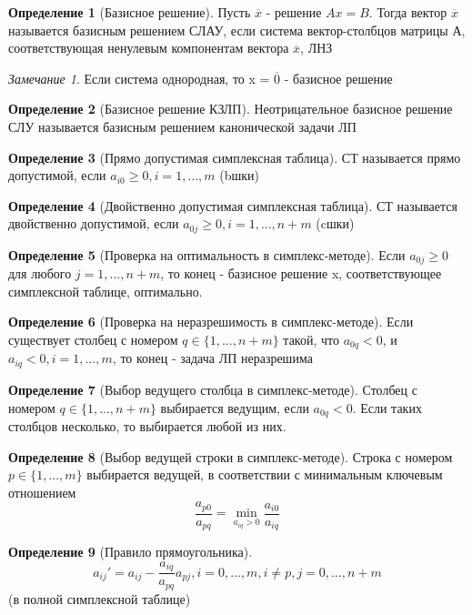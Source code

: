 \documentclass[a4paper]{article}
\theoremstyle{definition}
\newtheorem*{definition}{Определение}
\theoremstyle{remark}
\newtheorem*{remark}{Замечание}
\begin{document}
\begin{definition}[Базисное решение]
	Пусть $\overline{x}$ - решение $Ax = B$. Тогда вектор $\overline{x}$ называется базисным решением СЛАУ, если система вектор-столбцов матрицы А, соответствующая ненулевым компонентам вектора $\overline{x}$, ЛНЗ
\end{definition}\begin{remark}
	Если система однородная, то x = $\overline{0}$ - базисное решение
\end{remark}
\begin{definition}[Базисное решение КЗЛП]
	Неотрицательное базисное решение СЛУ называется базисным решением канонической задачи ЛП
\end{definition}

\begin{definition}[Прямо допустимая симплексная таблица]
	СТ называется прямо допустимой, если $a_{i0}\geq 0, i = 1, \dots, m$ (bшки)
\end{definition}
\begin{definition}[Двойственно допустимая симплексная таблица]
	СТ называется двойственно допустимой, если $a_{0j}\geq 0, i = 1, \dots, n+m$ (cшки)
\end{definition}
\begin{definition}[Проверка на оптимальность в симплекс-методе]
	Если $a_{0j} \ge 0$ для любого $j=1,…,n+m$, то конец - базисное решение x, соответствующее
	симплексной таблице, оптимально.
\end{definition}
\begin{definition}[Проверка на неразрешимость в симплекс-методе]
	Если существует столбец с номером $q\in \{1,...,n+m\}$ такой, что $a_{0q}<0$, и $a_{iq}<0, i=1,…,m$, то
	конец - задача ЛП неразрешима
\end{definition}
\begin{definition}[Выбор ведущего столбца в симплекс-методе]
	Столбец с номером $q\in\{1,...,n+m\}$ выбирается ведущим, если $a_{0q}<0$. Если таких столбцов
	несколько, то выбирается любой из них.
\end{definition}
\begin{definition}[Выбор ведущей строки в симплекс-методе]
	Строка с номером $p\in\{1,...,m\}$ выбирается ведущей, в соответствии с минимальным
	ключевым отношением
	\[\frac{a_{p0}}{a_{pq}} = \min_{a_{iq}>0}\frac{a_{i0}}{a_{iq}}\]
\end{definition}
\begin{definition}[Правило прямоугольника]
	\[a_{ij}' = a_{ij} - \frac{a_{iq}}{a_{pq}}a_{pj}, i = 0, \dots, m, i\neq p, j = 0, \dots, n+m\]
	(в полной симплексной таблице)
\end{definition}
\end{document}
